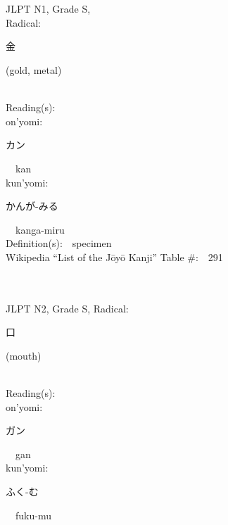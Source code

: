 \begin{multicols}{2}
\ \ \\
{\fontsize{34pt}{40pt}  }\ \ \\
{JLPT N1, Grade S, \\Radical:\ \ {\begin{CJK}{UTF8}{min} 金 \end{CJK}} (gold, metal) } \\
Reading(s):\ \ \\
{\hspace*{1em}}on'yomi:\ \ \\
{\hspace*{2em}}{\begin{CJK}{UTF8}{min} カン \end{CJK}}\ \ kan\ \ \\
{\hspace*{1em}}kun'yomi:\ \ \\
{\hspace*{2em}}{\begin{CJK}{UTF8}{min} かんが-みる \end{CJK}}\ \ kanga-miru\ \ \\
Definition(s):\ \ specimen \\
Wikipedia ``List of the J\=oy\=o Kanji'' Table \#:\ \ 291 \\
\ \ \\
{\fontsize{34pt}{40pt}  }\ \ \\  %
{JLPT N2, Grade S, Radical:\ \ {\begin{CJK}{UTF8}{min} 口 \end{CJK}} (mouth) } \\
Reading(s):\ \ \\
{\hspace*{1em}}on'yomi:\ \ \\
{\hspace*{2em}}{\begin{CJK}{UTF8}{min} ガン \end{CJK}}\ \ gan\ \ \\
{\hspace*{1em}}kun'yomi:\ \ \\
{\hspace*{2em}}{\begin{CJK}{UTF8}{min} ふく-む \end{CJK}}\ \ fuku-mu\ \ \\

\end{multicols}
